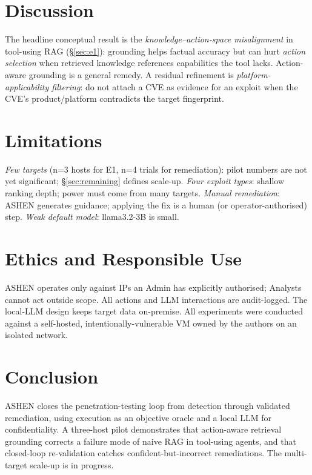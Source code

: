 \documentclass[conference]{IEEEtran}
\begin{document}
\section{Discussion}\label{sec:discussion}
The headline conceptual result is the \emph{knowledge--action-space misalignment}
in tool-using RAG (\S\ref{sec:e1}): grounding helps factual accuracy but can hurt
\emph{action selection} when retrieved knowledge references capabilities the tool
lacks. Action-aware grounding is a general remedy. A residual refinement is
\emph{platform-applicability filtering}: do not attach a CVE as evidence for an
exploit when the CVE's product/platform contradicts the target fingerprint.

\section{Limitations}
\emph{Few targets} (n=3 hosts for E1, n=4 trials for remediation): pilot numbers are not yet significant;
\S\ref{sec:remaining} defines scale-up. \emph{Four exploit types}: shallow
ranking depth; power must come from many targets. \emph{Manual remediation}: ASHEN
generates guidance; applying the fix is a human (or operator-authorised) step.
\emph{Weak default model}: llama3.2-3B is small.

\section{Ethics and Responsible Use}
ASHEN operates only against IPs an Admin has explicitly authorised; Analysts
cannot act outside scope. All actions and LLM interactions are audit-logged. The
local-LLM design keeps target data on-premise. All experiments were conducted
against a self-hosted, intentionally-vulnerable VM owned by the authors on an
isolated network.

\section{Conclusion}
ASHEN closes the penetration-testing loop from detection through validated
remediation, using execution as an objective oracle and a local LLM for
confidentiality. A three-host pilot demonstrates that action-aware retrieval
grounding corrects a failure mode of naive RAG in tool-using agents, and that
closed-loop re-validation catches confident-but-incorrect remediations. The
multi-target scale-up is in progress.
\end{document}

